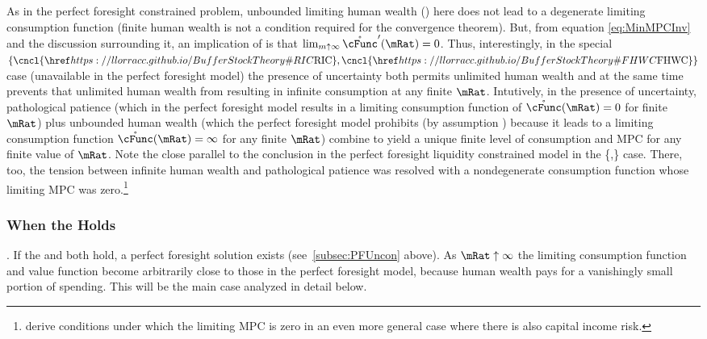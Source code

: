 \documentclass[BufferStockTheory]{subfiles}
\begin{document}
As in the perfect foresight constrained problem, unbounded limiting human wealth (\cncl{\FHWC}) here does not lead to a degenerate limiting consumption function (finite human wealth is not a condition required for the convergence theorem).  But, from equation \eqref{eq:MinMPCInv} and the discussion surrounding it, an implication of \cncl{\RIC} is that $\lim_{m \uparrow \infty} \mathring{\cFunc}^{\prime}(\mRat) = 0$.  Thus, interestingly, in the special $\{\cncl{\RIC},\cncl{\FHWC}\}$ case (unavailable in the perfect foresight model) the presence of uncertainty both permits unlimited human wealth and at the same time prevents that unlimited human wealth from resulting in infinite consumption at any finite $\mRat$.  Intutively, in the presence of uncertainty, pathological patience (which in the perfect foresight model results in a limiting consumption function of $\mathring{\cFunc}(\mRat)=0$ for finite $\mRat$) plus unbounded human wealth (which the perfect foresight model prohibits (by assumption {\FHWC}) because it leads to a limiting consumption function $\mathring{\cFunc}(\mRat)=\infty$ for any finite $\mRat$) combine to yield a unique finite level of consumption and MPC for any finite value of $\mRat$.  Note the close parallel to the conclusion in the perfect foresight liquidity constrained model in the \{\GICAbs,\cncl{\RIC}\} case.  There, too, the tension between infinite human wealth and pathological patience was resolved with a nondegenerate consumption function whose limiting MPC was zero.\footnote{\cite{maTodaRich} derive conditions under which the limiting MPC is zero in an even more general case where there is also capital income risk.}

\hypertarget{When-the-RIC-Holds}{}
\subsubsection{When the {\RIC} Holds}\label{subsubsec:WhenTheGICNrmFails}  \label{subsubsec:WhenTheRICHolds} 

\indent \textbf{\FHWC}.  If the {\RIC} and {\FHWC} both hold, a perfect foresight solution exists (see~\ref{subsec:PFUncon} above).  As $\mRat \uparrow \infty$ the limiting consumption function and value function become arbitrarily close to those in the perfect foresight model, because human wealth pays for a vanishingly small portion of spending.  This will be the main case analyzed in detail below.
\end{document}
